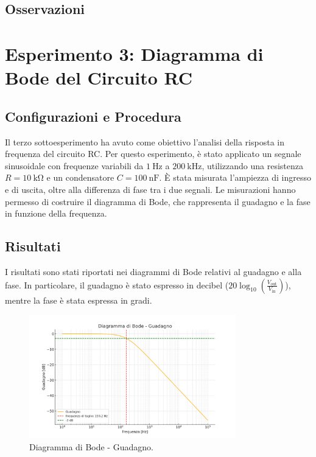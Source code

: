 \documentclass[a4paper,12pt]{article}
\begin{document}
\subsection{Osservazioni}


\section{Esperimento 3: Diagramma di Bode del Circuito RC}
\subsection{Configurazioni e Procedura}
Il terzo sottoesperimento ha avuto come obiettivo l'analisi della risposta in frequenza del circuito RC. Per questo esperimento, è stato applicato un segnale sinusoidale con frequenze variabili da \(\SI{1}{\hertz}\) a \(\SI{200}{\kilo\hertz}\), utilizzando una resistenza \( R = \SI{10}{\kilo\ohm} \) e un condensatore \( C = \SI{100}{\nano\farad} \). È stata misurata l'ampiezza di ingresso e di uscita, oltre alla differenza di fase tra i due segnali. Le misurazioni hanno permesso di costruire il diagramma di Bode, che rappresenta il guadagno e la fase in funzione della frequenza.

\subsection{Risultati}
I risultati sono stati riportati nei diagrammi di Bode relativi al guadagno e alla fase. In particolare, il guadagno è stato espresso in decibel (\(20 \log_{10} \left( \frac{V_{\text{out}}}{V_{\text{in}}} \right)\)), mentre la fase è stata espressa in gradi.

\begin{figure}[H]
\centering
\includegraphics[width=0.8\textwidth]{assets/bode_gain.png}
\caption{Diagramma di Bode - Guadagno.}
\end{figure}
\end{document}
